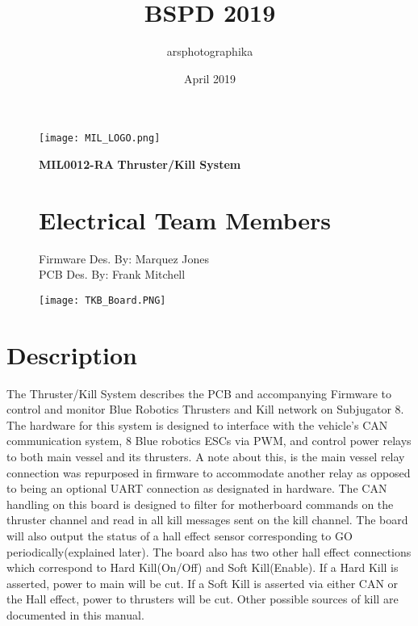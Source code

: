 \documentclass[a4paper,12pt,oneside,pdflatex,italian,final,twocolumn]{article}
\title{BSPD 2019}
\author{arsphotographika }
\date{April 2019}
\begin{document}
\pagestyle{fancy}



\onecolumn

\begin{figure}
\begin{minipage}{0.47\textwidth}
\centering
\texttt{[image: MIL\_LOGO.png]}

\end{minipage}
\hfill
\begin{minipage}{0.47\textwidth}
\raggedleft
\Huge \textbf{MIL0012-RA}
\Huge \textbf{Thruster/Kill System}
\end{minipage}
\end{figure}


\begin{figure}
\begin{minipage}{0.47\textwidth}

\section{Electrical Team Members}

        Firmware Des. By: Marquez Jones \\
        PCB Des. By: Frank Mitchell\\
  


\end{minipage}
\hfill
\begin{minipage}{0.47\textwidth}
\centering
\texttt{[image: TKB\_Board.PNG]}

\end{minipage}
\end{figure}


\vspace{-8cm}
\section{Description}
\vspace{-5cm}
    The Thruster/Kill System describes the PCB and accompanying Firmware to control and monitor Blue Robotics Thrusters and Kill network on Subjugator 8. The hardware for this system is designed to interface with the vehicle's CAN communication system, 8 Blue robotics ESCs via PWM, and control power relays to both main vessel and its thrusters. A note about this, is the main vessel relay connection was repurposed in firmware to accommodate another relay as opposed to being an optional UART connection as designated in hardware. The CAN handling on this board is designed to filter for motherboard commands on the thruster channel and read in all kill messages sent on the kill channel. The board will also output the status of a hall effect sensor corresponding to GO periodically(explained later). The board also has two other hall effect connections which correspond to Hard Kill(On/Off) and Soft Kill(Enable). If a Hard Kill is asserted, power to main will be cut. 
    If a Soft Kill is asserted via either CAN or the Hall effect, power to thrusters will be cut. Other possible sources of kill are documented in this manual. 
\end{document}
